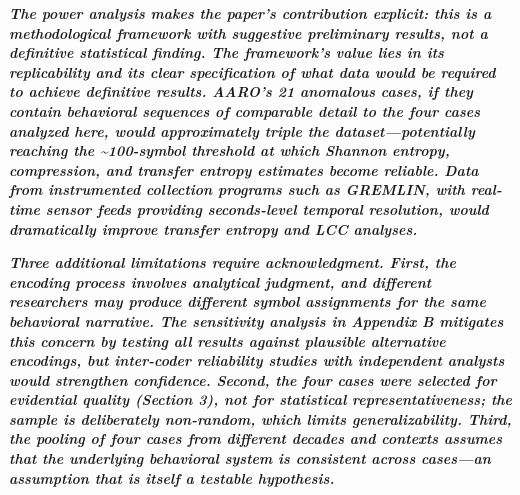 \documentclass[11pt,letterpaper]{article}
\begin{document}
\begin{table}[H]
\centering
\small
{}
\caption*{\small\textit{Table 16. Power analysis: current dataset adequacy and requirements for definitive testing.}}
\end{table}


\textbf{\textit{The power analysis makes the paper's contribution explicit: this is a methodological framework with suggestive preliminary results, not a definitive statistical finding. The framework's value lies in its replicability and its clear specification of what data would be required to achieve definitive results. AARO's 21 anomalous cases, if they contain behavioral sequences of comparable detail to the four cases analyzed here, would approximately triple the dataset---potentially reaching the \textasciitilde{}100-symbol threshold at which Shannon entropy, compression, and transfer entropy estimates become reliable. Data from instrumented collection programs such as GREMLIN, with real-time sensor feeds providing seconds-level temporal resolution, would dramatically improve transfer entropy and LCC analyses.}}


\textbf{\textit{Three additional limitations require acknowledgment. First, the encoding process involves analytical judgment, and different researchers may produce different symbol assignments for the same behavioral narrative. The sensitivity analysis in Appendix B mitigates this concern by testing all results against plausible alternative encodings, but inter-coder reliability studies with independent analysts would strengthen confidence. Second, the four cases were selected for evidential quality (Section 3), not for statistical representativeness; the sample is deliberately non-random, which limits generalizability. Third, the pooling of four cases from different decades and contexts assumes that the underlying behavioral system is consistent across cases---an assumption that is itself a testable hypothesis.}}
\end{document}
